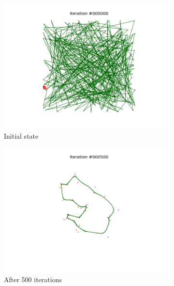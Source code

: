 \documentclass[11pt]{article}
\begin{document}
\begin{figure}
\centering
\begin{subfigure}{.33\textwidth}
  \centering
  \includegraphics[trim={4cm 1cm 4cm 1cm}, clip=true,
  width=\linewidth]{d_0.png}
  \caption{Initial state}
\end{subfigure}%
\begin{subfigure}{.33\textwidth}
  \centering
  \includegraphics[trim={6cm 2cm 6cm 2cm}, clip=true,width=\linewidth]{d_500.png}
  \caption{After 500 iterations}
\end{subfigure}
\begin{subfigure}{.33\textwidth}
  \centering

\end{subfigure}
\end{figure}
\end{document}
